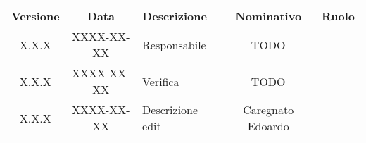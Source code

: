 {
    \renewcommand{\arraystretch}{1.5}
    \centering
    \begin{longtable}{ c c  C{4cm}  c  c }
        \rowcolor{\primaryColor}
        \textcolor{\secondaryColor}{
        \textbf{Versione}}     & \textcolor{\secondaryColor}{\textbf{Data}}       & \textcolor{\secondaryColor}
        {\textbf{Descrizione}} & \textcolor{\secondaryColor}{\textbf{Nominativo}} & \textcolor{\secondaryColor}{\textbf{Ruolo}}                          \\


        X.X.X                  & XXXX-XX-XX                                       & Responsabile                                & TODO & \responsabile{} \\
        X.X.X                  & XXXX-XX-XX                                       & Verifica                                    & TODO & \verificatore{} \\
        X.X.X                  & XXXX-XX-XX                                       & Descrizione edit                            & Caregnato Edoardo & \redattore{}    \\
    \end{longtable}
}